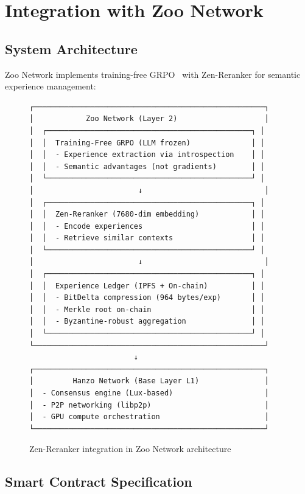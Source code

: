 \section{Integration with Zoo Network}


\subsection{System Architecture}

Zoo Network implements training-free GRPO~\cite{tencent2025grpo} with Zen-Reranker for semantic experience management:

\begin{figure}[h]
\centering
\begin{verbatim}
┌─────────────────────────────────────────────────────┐
│            Zoo Network (Layer 2)                    │
│  ┌───────────────────────────────────────────────┐ │
│  │  Training-Free GRPO (LLM frozen)              │ │
│  │  - Experience extraction via introspection    │ │
│  │  - Semantic advantages (not gradients)        │ │
│  └───────────────────────────────────────────────┘ │
│                        ↓                            │
│  ┌───────────────────────────────────────────────┐ │
│  │  Zen-Reranker (7680-dim embedding)            │ │
│  │  - Encode experiences                         │ │
│  │  - Retrieve similar contexts                  │ │
│  └───────────────────────────────────────────────┘ │
│                        ↓                            │
│  ┌───────────────────────────────────────────────┐ │
│  │  Experience Ledger (IPFS + On-chain)          │ │
│  │  - BitDelta compression (964 bytes/exp)       │ │
│  │  - Merkle root on-chain                       │ │
│  │  - Byzantine-robust aggregation               │ │
│  └───────────────────────────────────────────────┘ │
└─────────────────────────────────────────────────────┘
                        ↓
┌─────────────────────────────────────────────────────┐
│         Hanzo Network (Base Layer L1)               │
│  - Consensus engine (Lux-based)                     │
│  - P2P networking (libp2p)                          │
│  - GPU compute orchestration                        │
└─────────────────────────────────────────────────────┘
\end{verbatim}
\caption{Zen-Reranker integration in Zoo Network architecture}
\end{figure}

\subsection{Smart Contract Specification}

